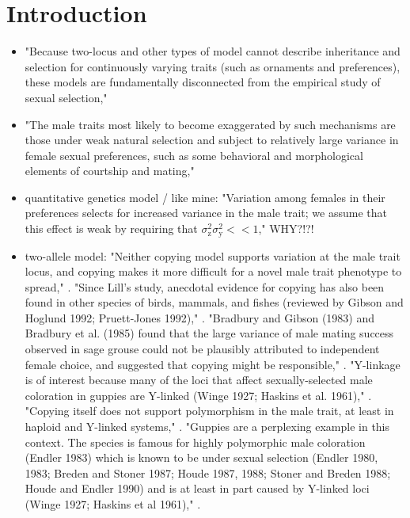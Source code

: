 \documentclass{article}\usepackage[]{graphicx}\usepackage[]{color}
\newcommand{\x}[1]{\text{#1}}
\begin{document}
\section{Introduction}
\begin{itemize}
\item "Because two-locus and other types of model cannot describe inheritance and selection for continuously varying traits (such as ornaments and preferences), these models are fundamentally disconnected from the empirical study of sexual selection," \cite{Mead:2004uq}

\item "The male traits most likely to become exaggerated by such mechanisms are those under weak natural selection and subject to relatively large variance in female sexual preferences, such as some behavioral and morphological elements of courtship and mating," \cite{Lande:1981fk}

\item quantitative genetics model / like mine: "Variation among females in their preferences selects for increased variance in the male trait; we assume that this effect is weak by requiring that $\sigma_\x{z}^2\sigma_\x{y}^2<<1$," \cite{Kirkpatrick:1990kx} WHY?!?!

\item two-allele model: "Neither copying model supports variation at the male trait locus, and copying makes it more difficult for a novel male trait phenotype to spread," \cite{Kirkpatrick:1994vn}. "Since Lill's study, anecdotal evidence for copying has also been found in other species of birds, mammals, and fishes (reviewed by Gibson and Hoglund 1992; Pruett-Jones 1992)," \cite{Kirkpatrick:1994vn}. "Bradbury and Gibson (1983) and Bradbury et al. (1985) found that the large variance of male mating success observed in sage grouse could not be plausibly attributed to independent female choice, and suggested that copying might be responsible," \cite{Kirkpatrick:1994vn}. "Y-linkage is of interest because many of the loci that affect sexually-selected male coloration in guppies are Y-linked (Winge 1927; Haskins et al. 1961)," \cite{Kirkpatrick:1994vn}. "Copying itself does not support polymorphism in the male trait, at least in haploid and Y-linked systems," \cite{Kirkpatrick:1994vn}. "Guppies are a perplexing example in this context. The species is famous for highly polymorphic male coloration (Endler 1983) which is known to be under sexual selection (Endler 1980, 1983; Breden and Stoner 1987; Houde 1987, 1988; Stoner and Breden 1988; Houde and Endler 1990) and is at least in part caused by Y-linked loci (Winge 1927; Haskins et al 1961)," \cite{Kirkpatrick:1994vn}.


\end{itemize}
\end{document}
